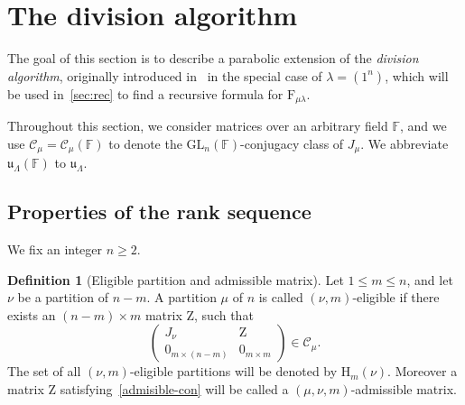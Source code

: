 \documentclass[12pt,a4paper,reqno]{amsart}
\theoremstyle{plain}
\theoremstyle{definition}
\newtheorem{definition}[theorem]{Definition}
\newcommand{\FF}{{\mathbb{F}}}
\newcommand{\1}{\mathds{1}}
\newcommand{\C}{\mathcal{C}}
\newcommand{\GL}{\mathrm{GL}}
\newcommand{\F}{\mathrm{F}}
\newcommand{\HH}{\mathrm{H}}
\newcommand{\Z}{\mathrm{Z}}
\renewcommand{\u}{\mathfrak{u}}
\begin{document}
 

\section{The division algorithm}
The goal of this section is to describe a
 parabolic extension of the \emph{division algorithm}, originally introduced in~\cites{Borodin,Kirillov} in the special case of $\lambda=(1^n)$,
which will be used in~\cref{sec:rec} to 
find a recursive formula for $\F_{\mu\lambda}$.



Throughout this section, 
we consider matrices  over an arbitrary field $\FF$, 
and we use
  $\mathcal C_\mu=\mathcal C_\mu(\FF)$ to denote the $\GL_n(\FF)$-conjugacy class of $J_\mu$. We abbreviate $\u_\Lambda(\FF)$ to $\u_\Lambda$. 







\subsection{Properties of the rank sequence}\label{seq: Division algorithm}  
We fix an integer $n \geq 2$. 





\begin{definition}[Eligible partition and admissible matrix]\label{eligible partition} Let $1 \leq m \leq n$, and let $\nu$ be a partition of $n-m$. A partition $\mu$ of $n$ is called $(\nu,m)$-eligible  if there exists  an $(n-m)\times m$ matrix $\Z$, such that
\begin{equation}\label{admisible-con}
\left(\begin{array}{c|c}
J_{\nu} & \Z\\ \hline
0_{m\times (n-m)} & 0_{m\times m}
\end{array}\right)\in \C_\mu. 
\end{equation}
The set of all $(\nu,m)$-eligible partitions will be denoted by $\HH_{m}(\nu)$. Moreover a matrix $\Z$ satisfying~\cref{admisible-con} will be called a $(\mu,\nu,m)$-admissible matrix. 
\end{definition}
\end{document}
